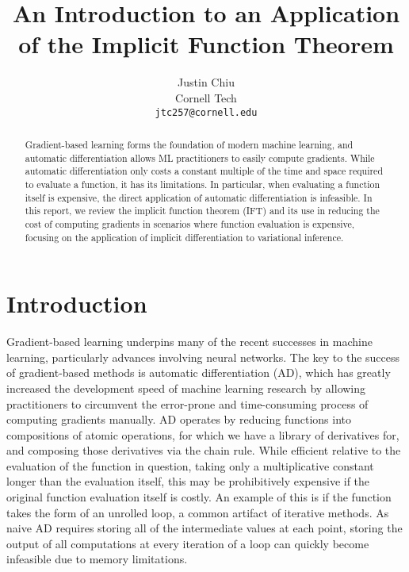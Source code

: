 \documentclass[11pt]{article}
\title{An Introduction to an Application of the Implicit Function Theorem}
\author{Justin Chiu \\
  Cornell Tech \\
  \texttt{jtc257@cornell.edu}}
\begin{document}
\maketitle
\begin{abstract}
Gradient-based learning forms the foundation of modern machine learning,
and automatic differentiation allows ML practitioners to easily compute gradients.
While automatic differentiation only costs a constant multiple of the time and space
required to evaluate a function, it has its limitations.
In particular, when evaluating a function itself is expensive,
the direct application of automatic differentiation is infeasible.
In this report, we review the implicit function theorem (IFT)
and its use in reducing the cost of computing gradients in scenarios where
function evaluation is expensive,
focusing on the application of implicit differentiation to variational inference.
\end{abstract}

\section{Introduction}
\label{sec:intro}
Gradient-based learning underpins many of the recent successes in machine learning,
particularly advances involving neural networks.
The key to the success of gradient-based methods is automatic differentiation (AD),
which has greatly increased the development speed of machine learning research by
allowing practitioners to circumvent the error-prone and time-consuming process
of computing gradients manually.
AD operates by reducing functions into compositions of atomic operations,
for which we have a library of derivatives for,
and composing those derivatives via the chain rule.
While efficient relative to the evaluation of the function in question,
taking only a multiplicative constant longer than the evaluation itself,
this may be prohibitively expensive if the original function evaluation itself is costly.
An example of this is if the function takes the form of an unrolled loop,
a common artifact of iterative methods.
As naive AD requires storing all of the intermediate values at each point,
storing the output of all computations at every iteration of a loop can quickly
become infeasible due to memory limitations.
\end{document}
